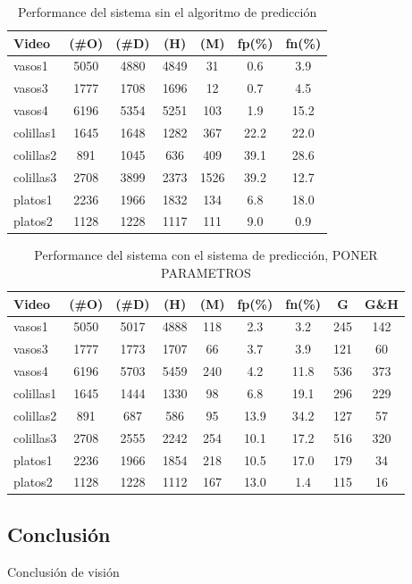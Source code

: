 \begin{table}[htb]
  \begin{tabular}{|l | c | c | c | c | c | c |}
	\hline  
	\textbf{Video} & \textbf{(\#O)} &  \textbf{(\#D)} & \textbf{(H)} & \textbf{(M)} & \textbf{fp(\%)} & \textbf{fn(\%)} \\
	\hline
	\hline
	vasos1 & 5050 & 4880 & 4849 & 31 & 0.6 & 3.9 \\
	vasos3 & 1777 & 1708 & 1696 & 12 & 0.7 & 4.5 \\
	vasos4 & 6196 & 5354 & 5251 & 103 & 1.9 & 15.2 \\
	\hline
	colillas1 & 1645 & 1648 & 1282 & 367 & 22.2 & 22.0 \\
	colillas2 & 891 & 1045 & 636 &  409 & 39.1 & 28.6 \\
	colillas3 & 2708 & 3899 & 2373 & 1526 & 39.2 & 12.7 \\
	\hline
	platos1 & 2236 & 1966 & 1832 & 134 & 6.8 & 18.0\\
	platos2 & 1128 & 1228 & 1117 & 111& 9.0 & 0.9 \\
	\hline
	\end{tabular}
	\label{tab:result}
	\caption{Performance del sistema sin el algoritmo de predicción}
\end{table}

\begin{table}[htb]
  \begin{tabular}{|l | c | c | c | c | c | c | c | c |}
	\hline  
	\textbf{Video} & \textbf{(\#O)} &  \textbf{(\#D)} & \textbf{(H)} & \textbf{(M)} & \textbf{fp(\%)} & \textbf{fn(\%)} & \textbf{G} & \textbf{G\&H} \\
	\hline
	\hline
	vasos1 & 5050 & 5017 & 4888 & 118 & 2.3 & 3.2  & 245 & 142\\
	vasos3 & 1777 & 1773 & 1707 & 66 & 3.7 & 3.9 & 121 & 60 \\
	vasos4 & 6196 & 5703 & 5459 & 240 & 4.2 & 11.8 & 536 & 373 \\
	\hline
	colillas1 & 1645 & 1444 & 1330 & 98 & 6.8 & 19.1 & 296 & 229 \\
	colillas2 & 891 & 687 & 586 & 95 & 13.9 & 34.2 & 127 & 57 \\
	colillas3 & 2708 & 2555 & 2242 & 254 & 10.1 & 17.2  & 516 & 320\\
	\hline
	platos1 & 2236 & 1966 & 1854 & 218 & 10.5 & 17.0 & 179 & 34\\
	platos2 & 1128 & 1228 & 1112 & 167& 13.0 & 1.4 & 115 & 16\\
	\hline
	\end{tabular}
	\label{tab:pred}
	\caption{Performance del sistema con el sistema de predicción, PONER PARAMETROS}
\end{table}

	
\subsection{Conclusi\'on}
Conclusi\'on de visi\'on


